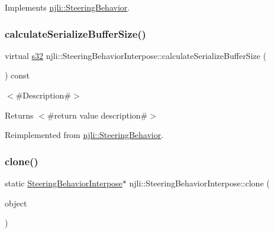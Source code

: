 Implements \mbox{\hyperlink{classnjli_1_1_steering_behavior_a9720953de1268f658636213946d76ed3}{njli\+::\+Steering\+Behavior}}.

\mbox{\label{classnjli_1_1_steering_behavior_interpose_a8b2c4a1124d344441df7c79d75779d60}} 
\subsubsection{\texorpdfstring{calculate\+Serialize\+Buffer\+Size()}{calculateSerializeBufferSize()}}
{\footnotesize\ttfamily virtual \mbox{\hyperlink{_util_8h_aa62c75d314a0d1f37f79c4b73b2292e2}{s32}} njli\+::\+Steering\+Behavior\+Interpose\+::calculate\+Serialize\+Buffer\+Size (\begin{DoxyParamCaption}{ }\end{DoxyParamCaption}) const\hspace{0.3cm}{\ttfamily [virtual]}}

$<$\#\+Description\#$>$

\begin{DoxyReturn}{Returns}
$<$\#return value description\#$>$ 
\end{DoxyReturn}


Reimplemented from \mbox{\hyperlink{classnjli_1_1_steering_behavior_abbc461d853c1b225cfde5b79d96d11bd}{njli\+::\+Steering\+Behavior}}.

\mbox{\label{classnjli_1_1_steering_behavior_interpose_a1d3fd4e43052faf9f0e34bd86990e962}} 
\subsubsection{\texorpdfstring{clone()}{clone()}}
{\footnotesize\ttfamily static \mbox{\hyperlink{classnjli_1_1_steering_behavior_interpose}{Steering\+Behavior\+Interpose}}$\ast$ njli\+::\+Steering\+Behavior\+Interpose\+::clone (\begin{DoxyParamCaption}\item[{const \mbox{\hyperlink{classnjli_1_1_steering_behavior_interpose}{Steering\+Behavior\+Interpose}} \&}]{object }\end{DoxyParamCaption})\hspace{0.3cm}{\ttfamily [static]}}



